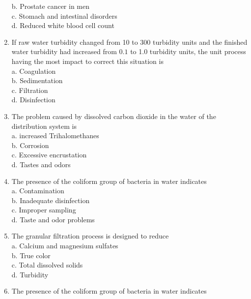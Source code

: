 \begin{enumerate}
b. Prostate cancer in men\\

c. Stomach and intestinal disorders\\

d. Reduced white blood cell count\\

  \item If raw water turbidity changed from 10 to 300 turbidity units and the finished water turbidity had increased from $0.1$ to 1.0 turbidity units, the unit process having the most impact to correct this situation is\\
a. Coagulation\\
b. Sedimentation\\
c. Filtration\\
d. Disinfection\\

\item The problem caused by dissolved carbon dioxide in the water of the distribution system is\\
a. increased Trihalomethanes\\
b. Corrosion\\
c. Excessive encrustation\\
d. Tastes and odors\\

\item The presence of the coliform group of bacteria in water indicates\\

a. Contamination\\

b. Inadequate disinfection\\

c. Improper sampling\\

d. Taste and odor problems\\


  \item The granular filtration process is designed to reduce\\
a. Calcium and magnesium sulfates\\

b. True color\\

c. Total dissolved solids\\

d. Turbidity\\


\item The presence of the coliform group of bacteria in water indicates\\


\end{enumerate}
